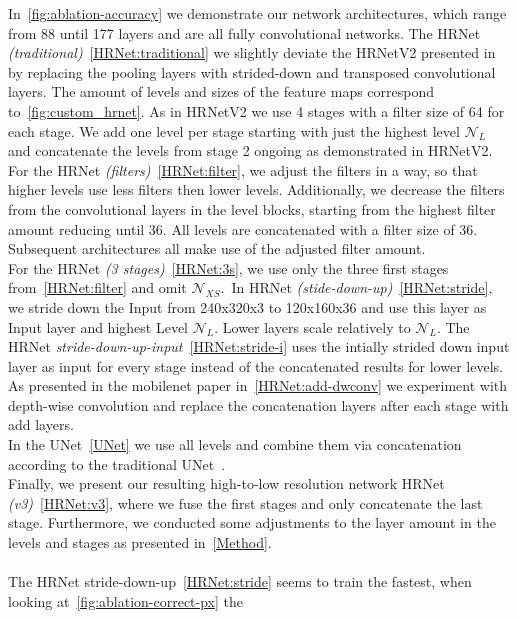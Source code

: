 In~\ref{fig:ablation-accuracy} we demonstrate our network architectures, which range from 88 until 177 layers and are
all fully convolutional networks.
The HRNet \textit{(traditional)}~\ref{HRNet:traditional} we slightly deviate the HRNetV2 presented in~\cite{HRNetv2} by replacing the pooling
layers with strided-down and transposed convolutional layers.
The amount of levels and sizes of the feature maps correspond to~\ref{fig:custom_hrnet}.
As in HRNetV2 we use 4 stages with a filter size of 64 for each stage.
We add one level per stage starting with just the highest level $\mathcal{N}_L$
and concatenate the levels from stage 2 ongoing as demonstrated in HRNetV2.\\
For the HRNet \textit{(filters)}~\ref{HRNet:filter}, we adjust the filters in a way, so that higher levels use less filters then lower levels.
Additionally, we decrease the filters from the convolutional layers in the level blocks, starting from the highest filter
amount reducing until 36.
All levels are concatenated with a filter size of 36.\\
Subsequent architectures all make use of the adjusted filter amount.\\
For the HRNet \textit{(3 stages)}~\ref{HRNet:3s}, we use only the three first stages from~\ref{HRNet:filter} and omit
$\mathcal{N}_{XS}$.\
In HRNet \textit{(stide-down-up)}~\ref{HRNet:stride}, we stride down the Input from 240x320x3 to 120x160x36 and use this layer as Input layer
and highest Level $\mathcal{N}_L$. Lower layers scale relatively to $\mathcal{N}_L$.
The HRNet \textit{stride-down-up-input}~\ref{HRNet:stride-i} uses the intially strided down input layer as input for
every stage instead of the concatenated results for lower levels.\\
As presented in the mobilenet paper \cite{mobilenet} in~\ref{HRNet:add-dwconv} we experiment with depth-wise convolution
and replace the concatenation layers after each stage with add layers.\\
In the UNet~\ref{UNet} we use all levels and combine them via concatenation according to the traditional UNet~\cite{unet}.\\
Finally, we present our resulting high-to-low resolution network HRNet \textit{(v3)}~\ref{HRNet:v3}, where we fuse
the first stages and only concatenate the last stage. Furthermore, we conducted some adjustments to the layer amount
in the levels and stages as presented in~\autoref{Method}.
\\\mbox{}\\
The HRNet stride-down-up~\ref{HRNet:stride} seems to train the fastest, when looking at~\ref{fig:ablation-correct-px} the
